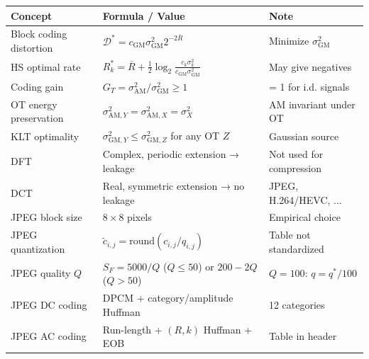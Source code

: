 \begin{center}
\begin{tabular}{|l|l|l|}
\hline
\textbf{Concept} & \textbf{Formula / Value} & \textbf{Note} \\ \hline
Block coding distortion & $\mathcal{D}^* = c_{\text{GM}}\sigma_{\text{GM}}^2 2^{-2\bar{R}}$ & Minimize $\sigma_{\text{GM}}^2$ \\ \hline
HS optimal rate & $R_k^* = \bar{R} + \frac{1}{2}\log_2\frac{c_k\sigma_k^2}{c_{\text{GM}}\sigma_{\text{GM}}^2}$ & May give negatives \\ \hline
Coding gain & $G_T = \sigma_{\text{AM}}^2 / \sigma_{\text{GM}}^2 \geq 1$ & = 1 for i.d. signals \\ \hline
OT energy preservation & $\sigma_{\text{AM},Y}^2 = \sigma_{\text{AM},X}^2 = \sigma_X^2$ & AM invariant under OT \\ \hline
KLT optimality & $\sigma_{\text{GM},Y}^2 \leq \sigma_{\text{GM},Z}^2$ for any OT $Z$ & Gaussian source \\ \hline
DFT & Complex, periodic extension → leakage & Not used for compression \\ \hline
DCT & Real, symmetric extension → no leakage & JPEG, H.264/HEVC, ... \\ \hline
JPEG block size & $8 \times 8$ pixels & Empirical choice \\ \hline
JPEG quantization & $\tilde{c}_{i,j} = \text{round}(c_{i,j}/q_{i,j})$ & Table not standardized \\ \hline
JPEG quality $Q$ & $S_F = 5000/Q$ ($Q\leq50$) or $200-2Q$ ($Q>50$) & $Q=100$: $q=q^*/100$ \\ \hline
JPEG DC coding & DPCM + category/amplitude Huffman & 12 categories \\ \hline
JPEG AC coding & Run-length + $(R,k)$ Huffman + EOB & Table in header \\ \hline
\end{tabular}
\end{center}


